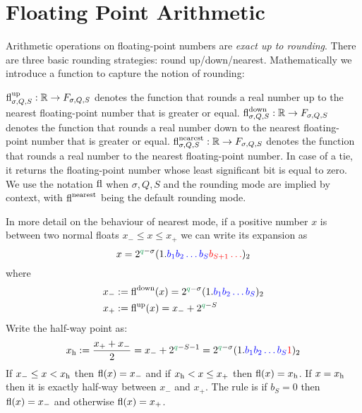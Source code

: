 
\section{Floating Point Arithmetic}
Arithmetic operations on floating-point numbers are  \emph{exact up to rounding}. There are three basic rounding strategies: round up/down/nearest. Mathematically we introduce a function to capture the notion of rounding:

\begin{definition}[rounding] ${\rm fl}^{\rm up}_{\ensuremath{\sigma},Q,S} : \mathbb R \rightarrow F_{\ensuremath{\sigma},Q,S}$ denotes the function that rounds a real number up to the nearest floating-point number that is greater or equal. ${\rm fl}^{\rm down}_{\ensuremath{\sigma},Q,S} : \mathbb R \rightarrow F_{\ensuremath{\sigma},Q,S}$ denotes the function that rounds a real number down to the nearest floating-point number that is greater or equal. ${\rm fl}^{\rm nearest}_{\ensuremath{\sigma},Q,S} : \mathbb R \rightarrow F_{\ensuremath{\sigma},Q,S}$ denotes the function that rounds a real number to the nearest floating-point number. In case of a tie, it returns the floating-point number whose least significant bit is equal to zero. We use the notation ${\rm fl}$ when $\ensuremath{\sigma},Q,S$ and the rounding mode are implied by context, with ${\rm fl}^{\rm nearest}$ being the default rounding mode. \end{definition}

In more detail on the behaviour of nearest mode, if a positive number $x$ is between two normal floats $x_- \ensuremath{\leq} x \ensuremath{\leq} x_+$ we can write its expansion as
\[
x = 2^{\green{q}-\ensuremath{\sigma}} (1.\blue{b_1b_2\ensuremath{\ldots}b_S}\red{b_{S+1}\ensuremath{\ldots}})_2
\]
where
\begin{align*}
x_- &:= {\rm fl}^{\rm down}(x) = 2^{\green{q}-\ensuremath{\sigma}} (1.\blue{b_1b_2\ensuremath{\ldots}b_S})_2 \\
x_+ &:= {\rm fl}^{\rm up}(x) = x_- + 2^{\green{q}-S}
\end{align*}
Write the half-way point as:
\[
x_{\rm h} := {x_+ + x_- \over 2} = x_- + 2^{\green{q}-S-1} = 2^{\green{q}-\ensuremath{\sigma}} (1.\blue{b_1b_2\ensuremath{\ldots}b_S}\red{1})_2
\]
If $x_- \ensuremath{\leq} x < x_{\rm h}$ then ${\rm fl}(x) = x_-$ and if $x_{\rm h} < x \ensuremath{\leq} x_+$ then ${\rm fl}(x) = x_{\rm h}$. If $x = x_{\rm h}$ then it is exactly half-way between $x_-$ and $x_+$. The rule is if $b_S = 0$ then ${\rm fl}(x) = x_-$ and otherwise ${\rm fl}(x) = x_+$.

